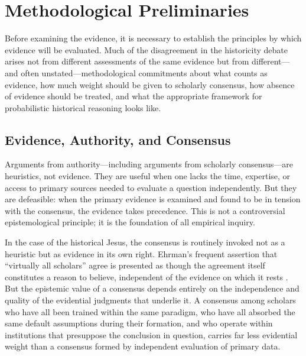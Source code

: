 \documentclass[12pt,oneside]{article}
\begin{document}
\section{Methodological Preliminaries}
\label{sec:method}

Before examining the evidence, it is necessary to establish the
principles by which evidence will be evaluated.  Much of the
disagreement in the historicity debate arises not from different
assessments of the same evidence but from different---and often
unstated---methodological commitments about what counts as evidence, how
much weight should be given to scholarly consensus, how absence of
evidence should be treated, and what the appropriate framework for
probabilistic historical reasoning looks like.

\subsection{Evidence, Authority, and Consensus}
\label{sec:method:authority}

Arguments from authority---including arguments from scholarly
consensus---are heuristics, not evidence.  They are useful when one
lacks the time, expertise, or access to primary sources needed to
evaluate a question independently.  But they are defeasible: when the
primary evidence is examined and found to be in tension with the
consensus, the evidence takes precedence.  This is not a controversial
epistemological principle; it is the foundation of all empirical inquiry.

In the case of the historical Jesus, the consensus is routinely invoked
not as a heuristic but as evidence in its own right.  Ehrman's frequent
assertion that ``virtually all scholars'' agree is presented as though
the agreement itself constitutes a reason to believe, independent of the
evidence on which it rests \citep{Ehrman2012}.  But the epistemic value
of a consensus depends entirely on the independence and quality of the
evidential judgments that underlie it.  A consensus among scholars who
have all been trained within the same paradigm, who have all absorbed
the same default assumptions during their formation, and who operate
within institutions that presuppose the conclusion in question, carries
far less evidential weight than a consensus formed by independent
evaluation of primary data.
\end{document}
